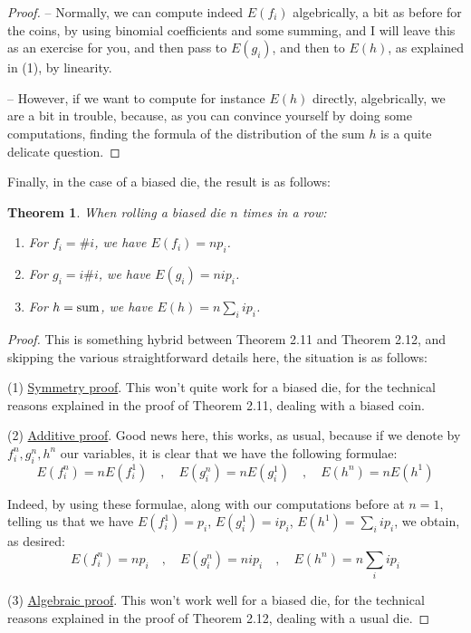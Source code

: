 \documentclass[12pt]{amsbook}
\newtheorem{theorem}{Theorem}[chapter]
\begin{document}
\begin{proof}
\medskip

-- Normally, we can compute indeed $E(f_i)$ algebrically, a bit as before for the coins, by using binomial coefficients and some summing, and I will leave this as an exercise for you, and then pass to $E(g_i)$, and then to $E(h)$, as explained in (1), by linearity.

\medskip

-- However, if we want to compute for instance $E(h)$ directly, algebrically, we are a bit in trouble, because, as you can convince yourself by doing some computations, finding the formula of the distribution of the sum $h$ is a quite delicate question.
\end{proof}

Finally, in the case of a biased die, the result is as follows:


\begin{theorem}
When rolling a biased die $n$ times in a row:
\begin{enumerate}
\item For $f_i=\#i$, we have $E(f_i)=np_i$.

\item For $g_i=i\#i$, we have $E(g_i)=nip_i$.

\item For $h={\rm sum}$, we have $E(h)=n\sum_iip_i$.
\end{enumerate} 
\end{theorem}

\begin{proof}
This is something hybrid between Theorem 2.11 and Theorem 2.12, and skipping the various straightforward details here, the situation is as follows:

\medskip

(1) \underline{Symmetry proof}. This won't quite work for a biased die, for the technical reasons explained in the proof of Theorem 2.11, dealing with a biased coin.

\medskip

(2) \underline{Additive proof}. Good news here, this works, as usual, because if we denote by $f_i^n,g_i^n,h^n$ our variables, it is clear that we have the following formulae:
$$E(f_i^n)=nE(f_i^1)\quad,\quad E(g_i^n)=nE(g_i^1)\quad,\quad E(h^n)=nE(h^1)$$

Indeed, by using these formulae, along with our computations before at $n=1$, telling us that we have $E(f_i^1)=p_i$, $E(g_i^1)=ip_i$, $E(h^1)=\sum_iip_i$, we obtain, as desired:
$$E(f_i^n)=np_i\quad,\quad E(g_i^n)=nip_i\quad,\quad E(h^n)=n\sum_iip_i$$

(3) \underline{Algebraic proof}. This won't work well for a biased die, for the technical reasons explained in the proof of Theorem 2.12, dealing with a usual die.
\end{proof}
\end{document}
